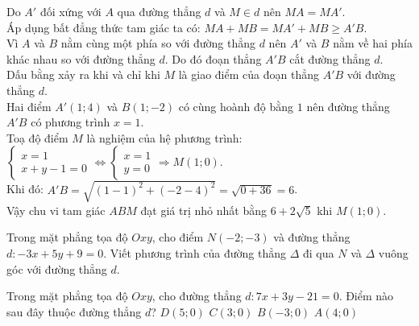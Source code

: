 \begin{bt}
{\begin{enumerate}[a)]
	Do $A'$ đối xứng với $A$ qua đường thẳng $d$ và $M \in d$ nên $MA = MA'$.\\
	Áp dụng bất đẳng thức tam giác ta có:
	$MA + MB = MA' + MB \ge A'B$.\\
	Vì $A$ và $B$ nằm cùng một phía so với đường thẳng $d$ nên $A'$ và $B$ nằm về hai phía khác nhau so với đường thẳng $d$. Do đó đoạn thẳng $A'B$ cắt đường thẳng $d$.\\
	Dấu bằng xảy ra khi và chỉ khi $M$ là giao điểm của đoạn thẳng $A'B$ với đường thẳng $d$.\\
	Hai điểm $A'(1; 4)$ và $B(1; -2)$ có cùng hoành độ bằng $1$ nên đường thẳng $A'B$ có phương trình $x = 1$.\\
	Toạ độ điểm $M$ là nghiệm của hệ phương trình:
	$\begin{cases} x = 1 \\ x + y - 1 = 0 \end{cases} \Leftrightarrow \begin{cases} x = 1 \\ y = 0 \end{cases} \Rightarrow M(1; 0)$.\\
	Khi đó: $A'B = \sqrt{(1 - 1)^2 + (-2 - 4)^2} = \sqrt{0 + 36} = 6$.\\
	Vậy chu vi tam giác $ABM$ đạt giá trị nhỏ nhất bằng $6 + 2\sqrt{5}$ khi $M(1; 0)$.
\end{enumerate}
}
\end{bt}

\begin{bt}%
	Trong mặt phẳng tọa độ $Oxy$, cho điểm $N(-2;-3)$ và đường thẳng $d\colon-3x+5y+9=0$. Viết phương trình của đường thẳng $\Delta$ đi qua $N$ và $\Delta$ vuông góc với đường thẳng $d$. 
\end{bt}

\begin{ex}%
	Trong mặt phẳng tọa độ $Oxy$, cho đường thẳng $d \colon 7x+3y-21=0$. Điểm nào sau đây thuộc đường thẳng $d$? 
	 \choice
		 {$D(5;0)$}
		{\True $C(3;0)$} 
		{$B(-3;0)$} 
		{$A(4;0)$} 
\end{ex}
